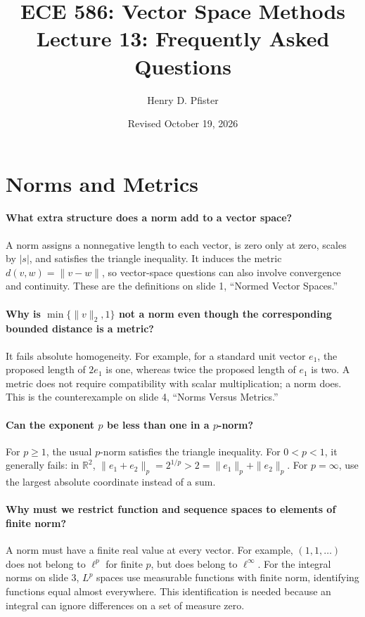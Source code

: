 \documentclass[10pt,english]{article}
\begin{document}
\title{ECE 586: Vector Space Methods \\ Lecture 13: Frequently Asked Questions}
\author{Henry D. Pfister \\ \univ}
\date{Revised October 19, 2026}

\maketitle

\section{Norms and Metrics}

\paragraph{What extra structure does a norm add to a vector space?}
A norm assigns a nonnegative length to each vector, is zero only at zero, scales by $|s|$, and satisfies the triangle inequality.
It induces the metric $d(v,w)=\|v-w\|$, so vector-space questions can also involve convergence and continuity.
These are the definitions on slide 1, ``Normed Vector Spaces.''

\paragraph{Why is $\min\{\|v\|_2,1\}$ not a norm even though the corresponding bounded distance is a metric?}
It fails absolute homogeneity.
For example, for a standard unit vector $e_1$, the proposed length of $2e_1$ is one, whereas twice the proposed length of $e_1$ is two.
A metric does not require compatibility with scalar multiplication; a norm does.
This is the counterexample on slide 4, ``Norms Versus Metrics.''

\paragraph{Can the exponent $p$ be less than one in a $p$-norm?}
For $p\geq1$, the usual $p$-norm satisfies the triangle inequality.
For $0<p<1$, it generally fails: in $\mathbb{R}^2$, $\|e_1+e_2\|_p=2^{1/p}>2=\|e_1\|_p+\|e_2\|_p$.
For $p=\infty$, use the largest absolute coordinate instead of a sum.

\paragraph{Why must we restrict function and sequence spaces to elements of finite norm?}
A norm must have a finite real value at every vector.
For example, $(1,1,\ldots)$ does not belong to $\ell^p$ for finite $p$, but does belong to $\ell^\infty$.
For the integral norms on slide 3, $L^p$ spaces use measurable functions with finite norm, identifying functions equal almost everywhere.
This identification is needed because an integral can ignore differences on a set of measure zero.
\end{document}
